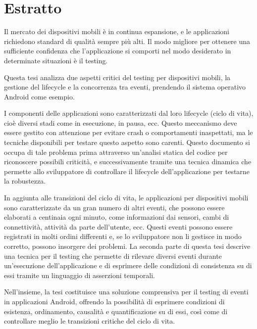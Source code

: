 \documentclass[11pt,a4paper,notitlepage]{article}
\newcommand{\emptypage} {\newpage\null\thispagestyle{empty}\newpage}
\begin{document}
\emptypage


\part*{Estratto}
Il mercato dei dispositivi mobili \`{e} in continua espansione, e le applicazioni  richiedono standard di qualit\`{a} sempre pi\`{u} alti. Il modo migliore per ottenere una sufficiente confidenza che l'applicazione si comporti nel modo desiderato in determinate situazioni \`{e} il testing.

Questa tesi analizza due aspetti critici del testing per dispositivi mobili, la gestione del lifecycle e la concorrenza tra eventi, prendendo il sistema operativo Android come esempio.

I componenti delle applicazioni sono caratterizzati dal loro lifecycle (ciclo di vita), cio\`{e} diversi stadi come in esecuzione, in pausa, ecc. Questo meccanismo deve essere gestito con attenzione per evitare crash o comportamenti inaspettati, ma le tecniche disponibili per testare questo aspetto sono carenti. Questo documento si occupa di tale problema prima attraverso un'analisi statica del codice per riconoscere possibili criticit\`{a}, e successivamente tramite una tecnica dinamica che permette allo sviluppatore di controllare il lifecycle dell'applicazione per testarne la robustezza.

In aggiunta alle transizioni del ciclo di vita, le applicazioni per dispositivi mobili sono caratterizzate da un gran numero di altri eventi, che possono essere elaborati a centinaia ogni minuto, come informazioni dai sensori, cambi di connettivit\`{a}, attivit\`{a} da parte dell'utente, ecc. Questi eventi possono essere registrati in molti ordini differenti e, se lo sviluppatore non li gestisce in modo corretto, possono insorgere dei problemi. La seconda parte di questa tesi descrive una tecnica per il testing che permette di rilevare diversi eventi durante un'esecuzione dell'applicazione e di esprimere delle condizioni di consistenza su di essi tramite un linguaggio di asserzioni temporali.

Nell'insieme, la tesi costituisce una soluzione comprensiva per il testing di eventi in applicazioni Android, offrendo la possibilit\`{a} di esprimere condizioni di esistenza, ordinamento, causalit\`{a} e quantificazione su di essi, cos\`{i} come di controllare meglio le transizioni critiche del ciclo di vita.

\emptypage


\end{document}

